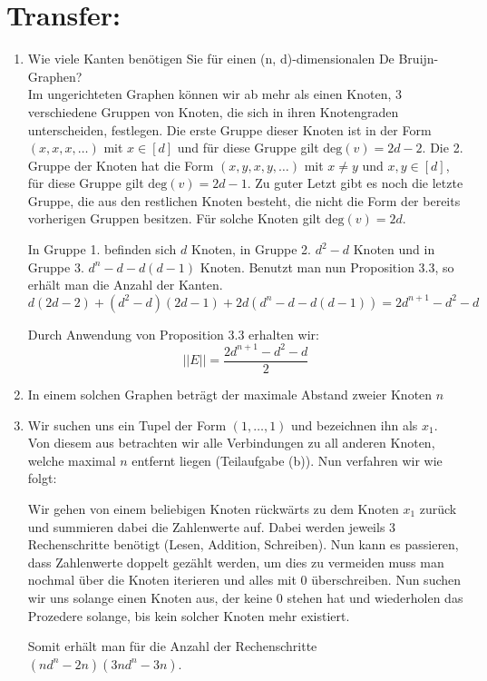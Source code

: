     \section*{Transfer:}
    \begin{enumerate}[label=(\alph*)]
    	\item Wie viele Kanten benötigen Sie für einen (n, d)-dimensionalen De Bruijn-Graphen?\\
        Im ungerichteten Graphen können wir ab mehr als einen Knoten, 3 verschiedene Gruppen von Knoten, 
        die sich in ihren Knotengraden unterscheiden, festlegen. Die erste Gruppe dieser Knoten ist in 
        der Form $(x,x,x,\ldots)$ mit $x \in [d]$ und für diese Gruppe gilt $\textrm{deg}(v) = 2d -2$. 
        Die 2. Gruppe der Knoten hat die Form $(x,y,x,y,\ldots)$ mit $x \not = y$ und $x,y \in [d]$, 
        für diese Gruppe gilt $\textrm{deg}(v) = 2d -1$. Zu guter Letzt gibt es noch die letzte Gruppe, 
        die aus den restlichen Knoten besteht, die nicht die Form der bereits vorherigen Gruppen besitzen. 
        Für solche Knoten gilt $\textrm{deg}(v) = 2d$.\par
        In Gruppe 1. befinden sich $d$ Knoten, in Gruppe 2. $d^2-d$ Knoten und in Gruppe 3. 
        $d^n - d - d(d-1)$ Knoten. Benutzt man nun Proposition 3.3, so erhält man die Anzahl der Kanten. 
        $$d(2d-2) + (d^2-d)(2d-1) + 2d(d^n-d-d(d-1)) = 2d^{n+1}-d^2-d$$
        
        Durch Anwendung von Proposition 3.3 erhalten wir:
        $$||E|| = \frac{2d^{n+1}-d^2-d}{2}$$
        \item In einem solchen Graphen beträgt der maximale Abstand zweier Knoten $n$
        
        \item Wir suchen uns ein Tupel der Form $(1,\ldots,1)$ und bezeichnen ihn als $x_1$. Von diesem 
        aus betrachten wir alle Verbindungen zu all anderen Knoten, welche maximal $n$ entfernt liegen 
        (Teilaufgabe (b)). Nun verfahren wir wie folgt: \par
        Wir gehen von einem beliebigen Knoten rückwärts zu dem Knoten $x_1$ zurück  und summieren dabei 
        die Zahlenwerte auf. Dabei werden jeweils 3 Rechenschritte benötigt (Lesen, Addition, Schreiben). 
        Nun kann es passieren, dass Zahlenwerte doppelt gezählt werden, um dies zu vermeiden muss man 
        nochmal über die Knoten iterieren und alles mit 0 überschreiben. Nun suchen wir uns solange 
        einen Knoten aus, der keine 0 stehen hat und wiederholen das Prozedere solange, bis kein 
        solcher Knoten mehr existiert. \par
        Somit erhält man für die Anzahl der Rechenschritte $(nd^n-2n)(3nd^n-3n)$.
    \end{enumerate}
